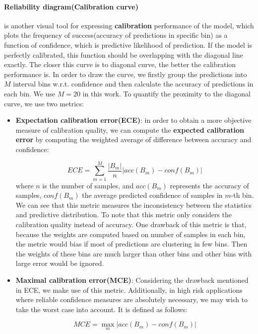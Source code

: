 \paragraph{Reliability diagram(Calibration curve)} is another visual tool for expressing \textbf{calibration} performance of the model\cite{guo2017calibration}, which plots the frequency of success(accuracy of predictions in specific bin) as a function of confidence, which is predictive likelihood of prediction. If the model is perfectly calibrated, this function should be overlapping with the diagonal line exactly. The closer this curve is to diagonal curve, the better the calibration performance is. In order to draw the curve, we firstly group the predictions into $M$ interval bins w.r.t. confidence and then calculate the accuracy of predictions in each bin. We use $M=20$ in this work. To quantify the proximity to the diagonal curve, we use two metrics:
\begin{itemize}
	\item \textbf{Expectation calibration error(ECE)}: in order to obtain a more objective measure of calibration quality, we can compute the \textbf{expected calibration error} by computing the weighted average of difference between accuracy and confidence:
	
	\begin{equation}
	ECE = \sum_{m=1}^{M}\frac{|B_m|}{n}|acc(B_m) - conf(B_m)|
	\end{equation}
	where $n$ is the number of samples, and $acc(B_m)$ represents the accuracy of samples, $conf(B_m)$ the average predicted confidence of samples in $m$-th bin. We can see that this metric measures the inconsistency between the statistics and predictive distribution. To note that this metric only considers the calibration quality instead of accuracy. One drawback of this metric is that, because the weights are computed based on number of samples in each bin, the metric would bias if most of predictions are clustering in few bins. Then the weights of these bins are much larger than other bins and other bins with large error would be ignored. 
	
	\item \textbf{Maximal calibration error(MCE)}:
	Considering the drawback mentioned in ECE, we make use of this metric. Additionally, in high risk applications where reliable confidence measures are absolutely necessary, we may wish to take the worst case into account. It is defined as follows:
	
	\begin{equation}
	MCE = \max_m|acc(B_m) - conf(B_m)|
	\end{equation}
\end{itemize}


